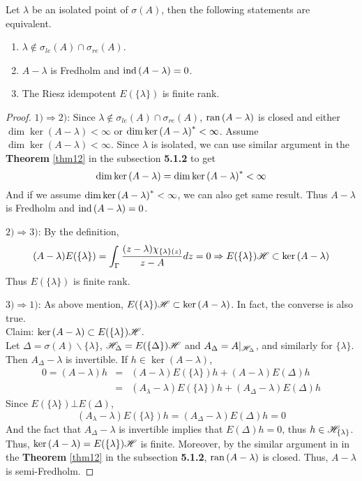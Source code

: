\documentclass[a4paper,11pt]{report}
\begin{document}
\begin{prop}
	Let $\lambda$ be an isolated point of $\sigma(A)$, then the following statements are equivalent.
	\begin{enumerate}[label = \arabic*)]
		\item $\lambda \notin \sigma_{le}(A) \cap \sigma_{re}(A)$.
		\item $A-\lambda$ is Fredholm and $\operatorname{ind}{(A-\lambda)} = 0$.
		\item The Riesz idempotent $E(\{\lambda\})$ is finite rank.
	\end{enumerate}
\end{prop}
\begin{proof}
	$1) \Rightarrow 2)$: Since $\lambda \notin \sigma_{le}(A) \cap \sigma_{re}(A)$, $\operatorname{ran}{(A-\lambda)}$ is closed and either $\dim{\ker{(A-\lambda)}} < \infty$ or $\dim{\ker{(A-\lambda)}^{*}} < \infty$. Assume $\dim{\ker{(A-\lambda)}} < \infty$. Since $\lambda$ is isolated, we can use similar argument in the \textbf{Theorem} \ref{thm12} in the subsection \textbf{5.1.2} to get
	\begin{equation*}
		\dim{\ker{(A-\lambda)}} = \dim{\ker{(A-\lambda)}^{*}} < \infty
	\end{equation*}
	And if we assume $\dim{\ker{(A-\lambda)}^{*}} < \infty$, we can also get same result. Thus $A-\lambda$ is Fredholm and $\operatorname{ind}{(A-\lambda)} = 0$.
	\item $2) \Rightarrow 3)$: By the definition,
	\begin{equation*}
		(A-\lambda)E(\{\lambda\}) = \int_{\Gamma} \frac{(z-\lambda)\chi_{\{\lambda\}(z)}}{z - A} dz = 0 \Rightarrow E(\{\lambda\})\mathscr{H} \subset \ker{(A-\lambda)}
	\end{equation*}
	Thus $E(\{\lambda\})$ is finite rank.
	\item $3) \Rightarrow 1)$: As above mention, $E(\{\lambda\})\mathscr{H} \subset \ker{(A-\lambda)}$. In fact, the converse is also true.\\
	Claim: $\ker{(A-\lambda)} \subset E(\{\lambda\})\mathscr{H}$. \\
	Let $\Delta = \sigma(A) \backslash \{\lambda\}$, $\mathscr{H}_{\Delta} = E(\{\Delta\})\mathscr{H}$ and $A_{\Delta} = A|_{\mathscr{H}_{\Delta}}$, and similarly for $\{\lambda\}$. Then $A_{\Delta} - \lambda$ is invertible. If $h \in \ker{(A-\lambda)}$, 
	\begin{eqnarray*}
	0 = (A-\lambda)h &=& (A-\lambda)E(\{\lambda\})h+(A-\lambda)E(\Delta)h \\
	&=& (A_{\lambda}-\lambda)E(\{\lambda\})h + (A_{\Delta}-\lambda)E(\Delta)h
	\end{eqnarray*}
	Since $E(\{\lambda\}) \bot E(\Delta)$, 
	\begin{equation*}
		(A_{\lambda}-\lambda)E(\{\lambda\})h = (A_{\Delta}-\lambda)E(\Delta)h = 0
	\end{equation*}
	And the fact that $A_{\Delta} - \lambda$ is invertible implies that $E(\Delta)h = 0$, thus $h \in \mathscr{H}_{\{\lambda\}}$. \\
	Thus, $\ker{(A-\lambda)} = E(\{\lambda\})\mathscr{H}$ is finite. Moreover, by the similar argument in in the \textbf{Theorem} \ref{thm12} in the subsection \textbf{5.1.2}, $\operatorname{ran}{(A-\lambda)}$ is closed. Thus, $A-\lambda$ is semi-Fredholm.
\end{proof}
\end{document}
